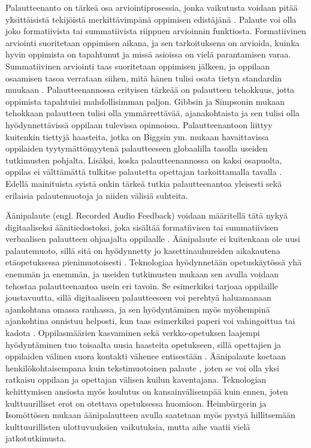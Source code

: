 \documentclass[utf8]{gradu3}
\begin{document}
Palautteenanto on tärkeä osa arviointiprosessia, jonka vaikutusta voidaan pitää yksittäisistä tekijöistä merkittävimpänä oppimisen edistäjänä \parencite[][]{gibbs2004}. Palaute voi olla joko formatiivista tai summatiivista riippuen arvioinnin funktiosta. Formatiivinen arviointi suoritetaan oppimisen aikana, ja sen tarkoituksena on arvioida, kuinka hyvin oppimista on tapahtunut ja missä asioissa on vielä parantamisen varaa. Summatiivinen arviointi taas suoritetaan oppimisen jälkeen, ja oppilaan osaamisen tasoa verrataan siihen, mitä hänen tulisi osata tietyn standardin muukaan \parencite[][]{biggs2011}. Palautteenannossa erityisen tärkeää on palautteen tehokkuus, jotta oppimista tapahtuisi mahdollisimman paljon. Gibbsin ja Simpsonin \parencite[][]{gibbs2004} mukaan tehokkaan palautteen tulisi olla ymmärrettävää, ajanakohtaista ja sen tulisi olla hyödynnettävissä oppilaan tulevissa opinnoissa. Palautteenantoon liittyy kuitenkin tiettyjä haasteita, jotka on Biggsin ym. \parencite[][]{biggs2011} mukaan havaittavissa oppilaiden tyytymättömyytenä palautteeseen globaalilla tasolla useiden tutkimusten pohjalta. Lisäksi, koska palautteenannossa on kaksi osapuolta, oppilas ei välttämättä tulkitse palautetta opettajan tarkoittamalla tavalla \parencite[][]{sadler2010}. Edellä mainituista syistä onkin tärkeä tutkia palautteenantoa yleisesti sekä erilaisia palautemuotoja ja niiden välisiä suhteita. 

Äänipalaute (engl. Recorded Audio Feedback) voidaan määritellä tätä nykyä digitaaliseksi äänitiedostoksi, joka sisältää formatiivisen tai summatiivisen verbaalisen palautteen ohjaajalta oppilaalle \parencite[][]{developing}. Äänipalaute ei kuitenkaan ole uusi palautemuoto, sillä sitä on hyödynnetty jo kasettinauhureiden aikakautena etäopetuksessa pienimuotoisesti \parencite[][]{developing}. Teknologiaa hyödynnetään opetuskäytössä yhä enemmän ja enemmän, ja useiden tutkimusten mukaan sen avulla voidaan tehostaa palautteenantoa usein eri tavoin. Se esimerkiksi tarjoaa oppilaille joustavuutta, sillä digitaaliseen palautteeseen voi perehtyä haluamanaan ajankohtana omassa rauhassa, ja sen hyödyntäminen myös myöhempinä ajankohtina onnistuu helposti, kun taas esimerkiksi paperi voi vahingoittua tai kadota \parencite[][]{technology}. Oppilasmäärien kasvaminen sekä verkko-opetuksen laajempi hyödyntäminen tuo toisaalta uusia haasteita opetukseen, sillä opettajien ja oppilaiden välinen suora kontakti vähenee entisestään \parencite[][]{engaging}. Äänipalaute koetaan henkilökohtaisempana kuin tekstimuotoinen palaute \parencite[][]{evaluating}, joten se voi olla yksi ratkaisu oppilaan ja opettajan välisen kuilun kaventajana. Teknologian kehittymisen ansiosta myös koulutus on kansainvälisempää kuin ennen, joten kulttuurilliset erot on otettava opetuksessa huomioon. Heimbürgerin ja Isomöttösen \parencite[][]{moderating} mukaan äänipalautteen avulla saatetaan myös pystyä hillitsemään kulttuurillisten ulottuvuuksien vaikutuksia, mutta aihe vaatii vielä jatkotutkimusta.
\end{document}
